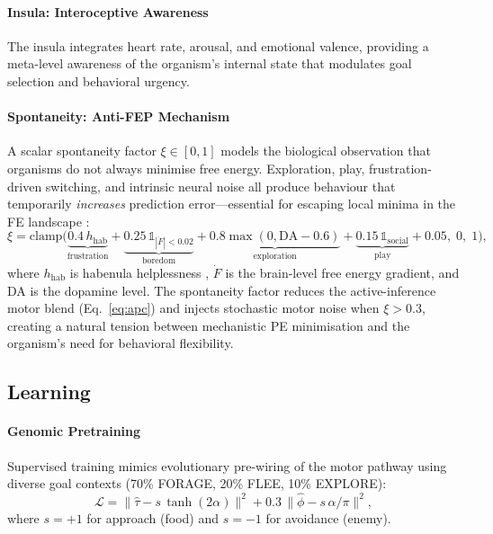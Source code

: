 \documentclass[12pt]{article}
\begin{document}
\paragraph{Insula: Interoceptive Awareness}

The insula integrates heart rate, arousal, and emotional valence,
providing a meta-level awareness of the organism's internal state
that modulates goal selection and behavioral urgency.

\paragraph{Spontaneity: Anti-FEP Mechanism}

A scalar spontaneity factor $\xi \in [0,1]$ models the biological
observation that organisms do not always minimise free energy.
Exploration, play, frustration-driven switching, and intrinsic neural
noise all produce behaviour that temporarily \emph{increases}
prediction error---essential for escaping local minima in the FE
landscape \citep{friston2012,schwartenbeck2013}:
\begin{equation}\label{eq:spontaneity}
  \xi = \text{clamp}\!\bigl(
    \underbrace{0.4\,h_\text{hab}}_\text{frustration}
    + \underbrace{0.25\,\mathbb{1}_{|\dot{F}|<0.02}}_\text{boredom}
    + \underbrace{0.8\max(0, \text{DA}-0.6)}_\text{exploration}
    + \underbrace{0.15\,\mathbb{1}_\text{social}}_\text{play}
    + 0.05,\; 0,\; 1 \bigr),
\end{equation}
where $h_\text{hab}$ is habenula helplessness \citep{hikosaka2010},
$\dot{F}$ is the brain-level free energy gradient, and DA is the
dopamine level.  The spontaneity factor reduces the active-inference
motor blend (Eq.~\ref{eq:apc}) and injects stochastic motor noise
when $\xi > 0.3$, creating a natural tension between mechanistic
PE minimisation and the organism's need for behavioral flexibility.

\subsection{Learning}\label{sec:learning}

\paragraph{Genomic Pretraining}

Supervised training mimics evolutionary pre-wiring of the motor
pathway using diverse goal contexts (70\% FORAGE, 20\% FLEE,
10\% EXPLORE):
\begin{equation}\label{eq:genomic}
  \mathcal{L} = \|\hat{\tau} - s\,\tanh(2\alpha)\|^2
    + 0.3\,\|\hat{\phi} - s\,\alpha/\pi\|^2,
\end{equation}
where $s = +1$ for approach (food) and $s = -1$ for avoidance (enemy).
\end{document}
